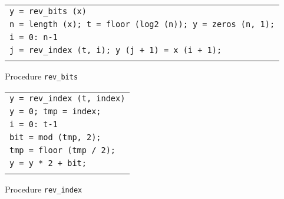 \begin{listing} \begin{footnotesize}
 
 
\noindent
{\upshape
\begin{tabular}{l} \texttt{\pfunction y = rev\_bits (x)} \\
\texttt{n = length (x); t = floor (log2 (n)); y = zeros (n, 1);} \\
\texttt{\pfor i = 0: n-1} \\
\quad \texttt{j = rev\_index (t, i); y (j + 1) = x (i + 1);} \\
\texttt{\pend} \\
\end{tabular}
}
 
\noindent \end{footnotesize}
 
\caption{Procedure \texttt{\upshape rev\_bits}}
 
\label{listing-rev_bits}
\end{listing}
 
\begin{listing} \begin{footnotesize}
 
 
\noindent
{\upshape
\begin{tabular}{l} \texttt{\pfunction y = rev\_index (t, index)} \\
\texttt{y = 0; tmp = index;} \\
\texttt{\pfor i = 0: t-1} \\
\quad \texttt{bit = mod (tmp, 2);} \\
\quad \texttt{tmp = floor (tmp / 2);} \\
\quad \texttt{y = y * 2 + bit;} \\
\texttt{\pend} \\
\end{tabular}
}
 
\noindent \end{footnotesize}
 
\caption{Procedure \texttt{\upshape rev\_index}}
 
\label{listing-rev_index}
\end{listing}
 
